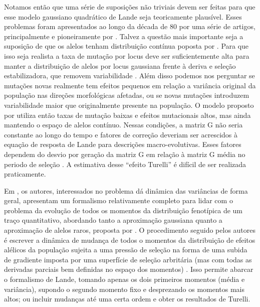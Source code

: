 Notamos então que uma série de suposições não triviais devem ser feitas
para que esse modelo gaussiano quadrático de Lande seja teoricamente
plausível. 
Esses problemas foram apresentados ao longo da década de 80 por uma
série de artigos, principalmente e pioneiramente por \citep{Turelli1984,
Turelli1985, Turelli1986, Barton1987}. 
Talvez a questão mais importante seja a suposição de que os alelos
tenham distribuição contínua poposta por \cite{Crow1964}. 
Para que isso seja realista a taxa de mutação por locus deve ser
suficientemente alta para manter a distribuição de alelos por locus
gaussiana frente à deriva e seleção estabilizadora, que removem
variabilidade \citep{Falconer1996}. 
Além disso podemos nos perguntar se mutações novas realmente tem efeitos
pequenos em relação a variância original da população nas direções
morfológicas afetadas, ou se novas mutações introduzem variabilidade
maior que originalmente presente na população. 
O modelo proposto por
\cite{Turelli1984} utiliza então taxas de mutação baixas e efeitos
mutacionais altos, mas ainda mantendo o espaço de alelos contínuo.
Nessas condições, a matriz G não seria constante ao longo do tempo e
fatores de correção deveriam ser acrescidos à equação de resposta de
Lande para descrições macro-evolutivas. 
Esses fatores dependem do desvio por geração da matriz G em relação à
matriz G média no periodo de seleção \citep{Jones2003}. 
A estimativa desse ``efeito Turelli'' é difícil de ser realizada
praticamente. 
 

Em \cite{Barton1987}, os autores, interessados no problema dá dinâmica
das variâncias de forma geral, apresentam um formalismo relativamente
completo para lidar com o problema da evolução de todos os momentos da
distribuição fenotípica de um traço quantitativo, abordando tanto a
aproximação gaussiana quanto a aproximação de alelos raros, proposta por
\cite{Turelli1984}. 
O procedimento seguido pelos autores é escrever a dinâmica de mudança de
todos o momentos da distribuição de efeitos alélicos da população
sujeita a uma pressão de seleção na forma de uma subida de gradiente
imposta por uma superfície de seleção arbritária (mas com todas as
derivadas parciais bem definidas no espaço dos momentos)
\citep{Arnold2001a}. 
Isso permite abarcar o formalismo de Lande, tomando apenas os dois
primeiros momentos (média e variância), supondo o segundo momento fixo e
desprezando os momentos mais altos; ou incluir mudanças até uma certa
ordem e obter os resultados de Turelli. 



